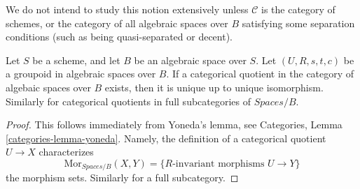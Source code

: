 \noindent
We do not intend to study this notion extensively unless
$\mathcal{C}$ is the category of schemes, or the category of all
algebraic spaces over $B$ satisfying some separation conditions
(such as being quasi-separated or decent).

\begin{lemma}
\label{lemma-categorical-unique}
Let $S$ be a scheme, and let $B$ be an algebraic space over $S$.
Let $(U, R, s, t, c)$ be a groupoid in algebraic spaces over $B$.
If a categorical quotient in the category of algebaic spaces
over $B$ exists, then it is unique up to unique isomorphism.
Similarly for categorical quotients in full subcategories of
$\textit{Spaces}/B$.
\end{lemma}

\begin{proof}
This follows immediately from Yoneda's lemma, see
Categories, Lemma \ref{categories-lemma-yoneda}. Namely, the definition
of a categorical quotient $U \to X$ characterizes
$$
\text{Mor}_{\textit{Spaces}/B}(X, Y) =
\{R\text{-invariant morphisms }U \to Y\}
$$
the morphism sets. Similarly for a full subcategory.
\end{proof}














